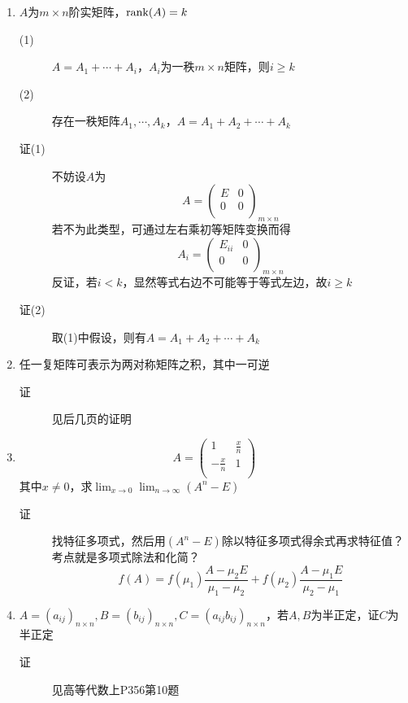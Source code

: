 \begin{enumerate}
\item $A$为$m\times n$阶实矩阵，$\operatorname{rank}(A)=k$
\begin{description}
\item[(1)] $A = A_1 + \cdots + A_i$，$A_i$为一秩$m \times n$矩阵，则$i\geq k$
\item[(2)] 存在一秩矩阵$A_1,\cdots,A_k$，$A=A_1+A_2+\cdots+A_k$
\item[证(1)] 不妨设$A$为
\[
A= \left(
\begin{array}{cc}
E & 0 \\
0 & 0 \\
\end{array} \right)_{m\times n}
\]
若不为此类型，可通过左右乘初等矩阵变换而得
\[
A_i= \left(
\begin{array}{cc}
E_{ii} & 0 \\
0 & 0 \\
\end{array} \right)_{m\times n}
\]
反证，若$i < k$，显然等式右边不可能等于等式左边，故$i\geq k$
\item[证(2)] 取(1)中假设，则有$A=A_1+A_2+\cdots+A_k$
\end{description}

\item 任一复矩阵可表示为两对称矩阵之积，其中一可逆
\begin{description}
\item[证] 见后几页的证明
\end{description}

\item
\[
A= \left(
\begin{array}{cc}
1 & \frac{x}{n} \\
-\frac{x}{n} & 1 \\
\end{array} \right)
\]
其中$x\neq 0 $，求$\lim_{x \to 0}\lim_{n \to \infty}(A^n - E)$
\begin{description}
\item[证] 找特征多项式，然后用$(A^n - E)$除以特征多项式得余式再求特征值？考点就是多项式除法和化简？
\[
f(A) = f(\mu_1)\frac{A-\mu_2E}{\mu_1-\mu_2}+f(\mu_2)\frac{A-\mu_1E}{\mu_2-\mu_1}
\]
\end{description}

\item $A=(a_{ij})_{n\times n},B=(b_{ij})_{n\times n},C=(a_{ij}b_{ij})_{n\times n}$，若$A,B$为半正定，证$C$为半正定
\begin{description}
\item[证] 见高等代数上P356第10题
\end{description}


\end{enumerate}
